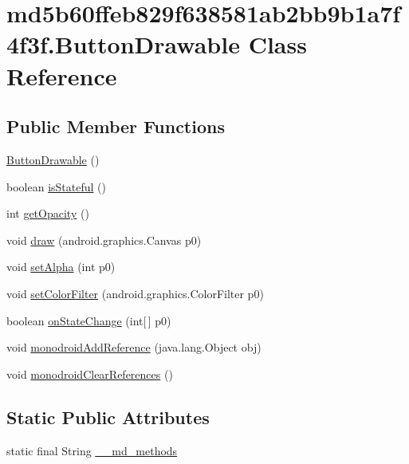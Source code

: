 \hypertarget{classmd5b60ffeb829f638581ab2bb9b1a7f4f3f_1_1_button_drawable}{
\section{md5b60ffeb829f638581ab2bb9b1a7f4f3f.ButtonDrawable Class Reference}
\label{classmd5b60ffeb829f638581ab2bb9b1a7f4f3f_1_1_button_drawable}
}
\subsection*{Public Member Functions}
\begin{CompactItemize}
\item 
\hyperlink{classmd5b60ffeb829f638581ab2bb9b1a7f4f3f_1_1_button_drawable_178782ff509c82a2749a13c2d25b574a}{ButtonDrawable} ()
\item 
boolean \hyperlink{classmd5b60ffeb829f638581ab2bb9b1a7f4f3f_1_1_button_drawable_8813c266cfea5b86307c54f087e8415e}{isStateful} ()
\item 
int \hyperlink{classmd5b60ffeb829f638581ab2bb9b1a7f4f3f_1_1_button_drawable_ca42330a9c1c475329d8d893e1d384b3}{getOpacity} ()
\item 
void \hyperlink{classmd5b60ffeb829f638581ab2bb9b1a7f4f3f_1_1_button_drawable_bed61f66aa2554190f102b5f1daae539}{draw} (android.graphics.Canvas p0)
\item 
void \hyperlink{classmd5b60ffeb829f638581ab2bb9b1a7f4f3f_1_1_button_drawable_d2ae8f92af86ee4457c747cd1a4d3cdd}{setAlpha} (int p0)
\item 
void \hyperlink{classmd5b60ffeb829f638581ab2bb9b1a7f4f3f_1_1_button_drawable_f4559250a88a0e4db90f1f31884febae}{setColorFilter} (android.graphics.ColorFilter p0)
\item 
boolean \hyperlink{classmd5b60ffeb829f638581ab2bb9b1a7f4f3f_1_1_button_drawable_4583a9633a285d9cdc9c112ba85eae43}{onStateChange} (int\mbox{[}$\,$\mbox{]} p0)
\item 
void \hyperlink{classmd5b60ffeb829f638581ab2bb9b1a7f4f3f_1_1_button_drawable_b4d53f552f49b8d6700b3c20efd42c26}{monodroidAddReference} (java.lang.Object obj)
\item 
void \hyperlink{classmd5b60ffeb829f638581ab2bb9b1a7f4f3f_1_1_button_drawable_f8a9ee7b4fa25e81b8827f78581c1025}{monodroidClearReferences} ()
\end{CompactItemize}
\subsection*{Static Public Attributes}
\begin{CompactItemize}
\item 
static final String \hyperlink{classmd5b60ffeb829f638581ab2bb9b1a7f4f3f_1_1_button_drawable_a04b94d1936232b4a6afd49d724c48c0}{\_\-\_\-md\_\-methods}
\end{CompactItemize}
